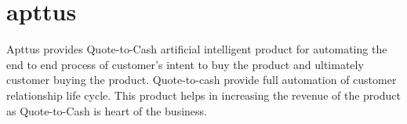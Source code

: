 \section{apttus}

Apttus provides Quote-to-Cash artificial intelligent product for automating the end to end process of customer's intent to buy the product and ultimately customer buying the product. Quote-to-cash provide full automation of customer relationship life cycle. This product helps in increasing the revenue of the product as Quote-to-Cash is heart of the business\cites{hid-sp18-511-apttus}.

